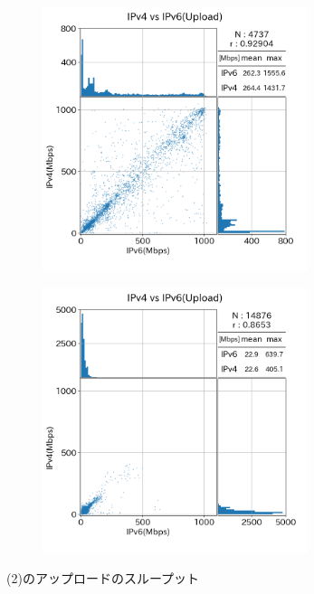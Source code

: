\begin{figure}[htbp]
\begin{center}
\begin{minipage}[t]{0.48\textwidth}
\begin{subfigure}[b]{\textwidth}
                \label{new_FTTH_ul}
            \end{subfigure}
            \begin{subfigure}[b]{\textwidth}
                \centering
                \includegraphics[width=0.85\textwidth]{fig/new_CATV_ul.png}
                \label{new_CATV_ul}
            \end{subfigure}
            \begin{subfigure}[b]{\textwidth}
                \centering
                \includegraphics[width=0.85\textwidth]{fig/new_Mobile_ul.png}
                \label{new_Mobile_ul}
            \end{subfigure}
            \caption{(2)のアップロードのスループット}
            \label{fig:new_Line_ul}
        \end{minipage}
    \end{center}
\end{figure}
\FloatBarrier


